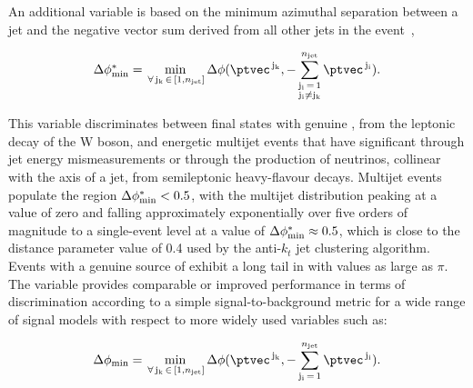 An additional variable is based on the minimum azimuthal separation
between a jet and the negative vector \ptvec sum derived from all
other jets in the event~\cite{RA1Paper},


\begin{equation}
  \bdphi = \min_{\,\forall\, \mathrm{j_k} \,\in\, [1,\njet]}
  \Delta\phi( \ptvec^{\,\mathrm{j_k}}, 
  -\sum_{\substack{\mathrm{j_i}\, =\, 1 \\ \mathrm{j_i} \ne \mathrm{j_k}}}^{\njet}
  \ptvec^{\,\mathrm{j_i}}).   
  \label{eq:bdphi}
\end{equation}

This variable discriminates between final states with genuine
\ptvecmiss, \eg from the leptonic decay of the W boson, and energetic
multijet events that have significant \ptvecmiss through jet energy
mismeasurements or through the production of neutrinos, collinear with
the axis of a jet, from semileptonic heavy-flavour decays. Multijet
events populate the region $\mbox{$\Delta\phi^{*}_{\rm min}$} < 0.5$, with the multijet
distribution peaking at a value of zero and falling approximately
exponentially over five orders of magnitude to a single-event level at
a value of $\mbox{$\Delta\phi^{*}_{\rm min}$} \approx 0.5$, which is close to the distance
parameter value of 0.4 used by the anti-$k_t$ jet clustering
algorithm. Events with a genuine source of \ptvecmiss exhibit a long
tail in \bdphi with values as large as $\pi$. The \bdphi variable
provides comparable or improved performance in terms of discrimination
according to a simple signal-to-background metric for a wide range of
signal models with respect to more widely used variables such as:

\begin{equation}
  \Delta\phi_\text{min} = \min_{\,\forall\, \mathrm{j_k} \,\in\, [1,\njet]}
  \Delta\phi(\ptvec^{\,\mathrm{j_k}}, -\sum_{\mathrm{j_i}\, =\, 1}^{\njet}
  \ptvec^{\,\mathrm{j_i}}).
  \label{eq:dphi}
\end{equation}


